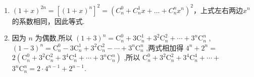 \begin{enumerate}
\begin{jieda}
\begin{enumerate}
\item $(1+x)^{2n}=[(1+x)^n]^2=(C^0_n+C^1_nx+...+C^n_nx^n)^2$，上式左右两边$x^n$的系数相同，因此等式.

\item 因为 $n$ 为偶数,所以 ${\left( 1 + 3\right) }^{n} = {\mathrm{C}}_{n}^{0} + 3{\mathrm{C}}_{n}^{1} + {3}^{2}{\mathrm{C}}_{n}^{2} + \cdots  + {3}^{n}{\mathrm{C}}_{n}^{n}$ ,
${\left( 1 - 3\right) }^{n} = {\mathrm{C}}_{n}^{0} - 3{\mathrm{C}}_{n}^{1} + {3}^{2}{\mathrm{C}}_{n}^{2} - \cdots  + {3}^{n}{\mathrm{C}}_{n}^{n}$ ,两式相加得 ${4}^{n} + {2}^{n} =$
$2\left( {{\mathrm{C}}_{n}^{0} + {3}^{2}{\mathrm{C}}_{n}^{2} + {3}^{4}{\mathrm{C}}_{n}^{4} + \cdots  + {3}^{n}{\mathrm{C}}_{n}^{n}}\right)$ ,所以 ${\mathrm{C}}_{n}^{0} + {3}^{2}{\mathrm{C}}_{n}^{2} + {3}^{4}{\mathrm{C}}_{n}^{4} + \cdots  +$
${3}^{n}{\mathrm{C}}_{n}^{n} = 2 \cdot  {4}^{n - 1} + {2}^{n - 1}.$
\end{enumerate}


    
\end{jieda}


\end{enumerate}

\clearpage

